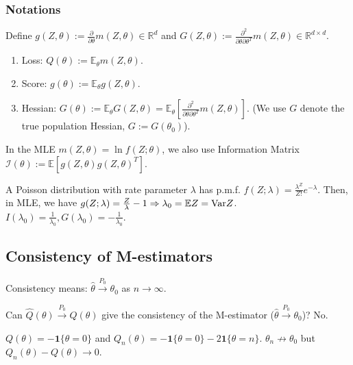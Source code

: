 \documentclass[11pt]{elegantbook}
\begin{document}
\subsubsection*{Notations}
Define $g(Z,\theta):=\frac{\partial}{\partial \theta}m(Z,\theta)\in \mathbb{R}^d$ and $G(Z,\theta):=\frac{\partial^2}{\partial \theta\partial \theta^T}m(Z,\theta)\in \mathbb{R}^{d\times d}$.
\begin{definition}
\normalfont
\begin{enumerate}
    \item Loss: $Q(\theta):=\mathbb{E}_{\theta}m(Z,\theta)$.
    \item Score: $g(\theta):=\mathbb{E}_{\theta}g(Z,\theta)$.
    \item Hessian: $G(\theta):=\mathbb{E}_{\theta}G(Z,\theta)= \mathbb{E}_\theta\left[\frac{\partial^2}{\partial \theta\partial \theta^T}m(Z,\theta)\right]$. (We use $G$ denote the true population Hessian, $G:=G(\theta_0)$).
\end{enumerate}
\end{definition}
In the MLE $m(Z,\theta)=\ln f(Z;\theta)$, we also use Information Matrix $\mathcal{I}(\theta):=\mathbb{E}[g(Z,\theta)g(Z,\theta)^T]$.
\begin{example}
    A Poisson distribution with rate parameter $\lambda$ has p.m.f. $f(Z;\lambda)=\frac{\lambda^Z}{Z!}e^{-\lambda}$. Then, in MLE, we have $g(Z;\lambda)=\frac{Z}{\lambda}-1 \Rightarrow \lambda_0=\mathbb{E}Z=\textnormal{Var}Z$. $I(\lambda_0)=\frac{1}{\lambda_0}, G(\lambda_0)=-\frac{1}{\lambda_0}$.
\end{example}



\subsection{Consistency of M-estimators}
Consistency means: $\hat{\theta} \stackrel{P_0}{\longrightarrow} \theta_0$ as $n \rightarrow \infty$.

Can $\hat{Q}(\theta)\stackrel{P_0}{\longrightarrow} Q(\theta)$ give the consistency of the M-estimator ($\hat{\theta} \stackrel{P_0}{\longrightarrow} \theta_0$)? No.
\begin{example}
    $Q(\theta)=-\mathbf{1}\{\theta=0\}$ and $Q_n(\theta)=-\mathbf{1}\{\theta=0\}-2\mathbf{1}\{\theta=n\}$. $\theta_n \nrightarrow \theta_0$ but $Q_n(\theta)-Q(\theta) \rightarrow 0$.
\end{example}
\end{document}
